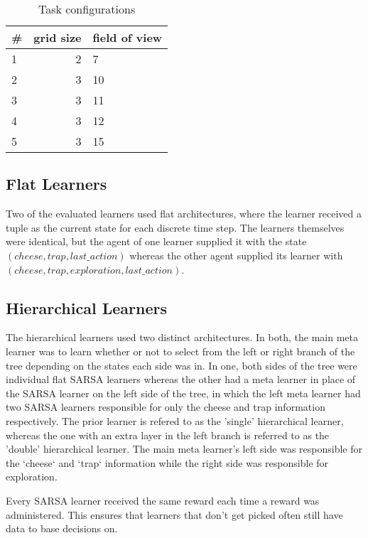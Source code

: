 \documentclass{article}
\begin{document}
	\begin{table}[h]
		\centering
		\begin{tabular}{l | r | l }
			\# & grid size & field of view \\ 
			\hline
			1 & 2 & 7  \\
			2 & 3 & 10 \\
			3 & 3 & 11 \\
			4 & 3 & 12 \\
			5 & 3 & 15 \\
		 \end{tabular}
		 \caption{Task configurations}
		 \label{tbl:task-config}
	 \end{table}

	\subsection{Flat Learners}
	\label{s:met:flat}
	Two of the evaluated learners used flat architectures, where the learner received a tuple as the current state for each discrete time step. The learners themselves were identical, but the agent of one learner supplied it with the state $(cheese, trap, last\_action)$ whereas the other agent supplied its learner with $(cheese, trap, exploration, last\_action)$. 

	\subsection{Hierarchical Learners}
	\label{s:met:meta}
	The hierarchical learners used two distinct architectures. In both, the main meta learner was to learn whether or not to select from the left or right branch of the tree depending on the states each side was in. In one, both sides of the tree were individual flat SARSA learners whereas the other had a meta learner in place of the SARSA learner on the left side of the tree, in which the left meta learner had two SARSA learners responsible for only the cheese and trap information respectively.
	The prior learner is refered to as the 'single' hierarchical learner, whereas the one with an extra layer in the left branch is referred to as the 'double' hierarchical learner.
	The main meta learner's left side was responsible for the `cheese` and `trap` information while the right side was responsible for exploration. 

	Every SARSA learner received the same reward each time a reward was administered. This ensures that learners that don't get picked often still have data to base decisions on.
\end{document}
